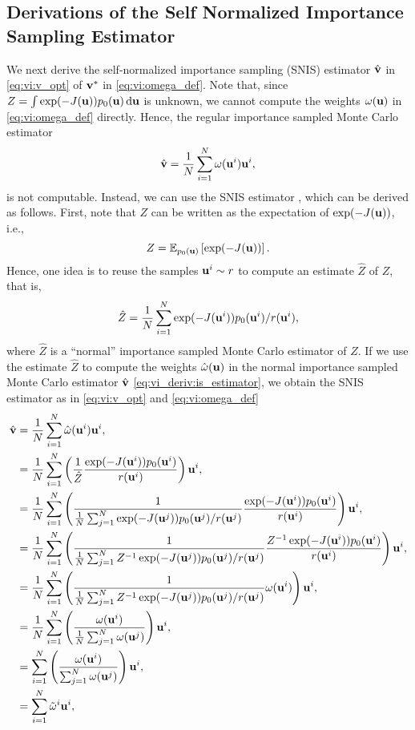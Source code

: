 \subsection{Derivations of the Self Normalized Importance Sampling Estimator} \label{app:VI SNIS}
We next derive the self-normalized importance sampling (SNIS) estimator $\hat{{\bf v}}$ in \eqref{eq:vi:v_opt} of ${\bf v}^*$ in \eqref{eq:vi:omega_def}.
Note that, since $Z=\int \exp(-J({\bf u})) p_0({\bf u}) \mathop{}\!\mathrm{d}{{\bf u}}$ is unknown, we cannot compute the weights $\omega({\bf u})$ in \eqref{eq:vi:omega_def} directly.
Hence, the regular importance sampled Monte Carlo estimator
\begin{equation} \label{eq:vi_deriv:is_estimator}
    \hat{{\bf v}} = \frac{1}{N} \sum_{i=1}^N \omega({\bf u}^i) {\bf u}^i,
\end{equation}
is not computable.
Instead, we can use the SNIS estimator \cite{owen2013monte}, which can be derived as follows.
First, note that $Z$ can be written as the expectation of $\exp(-J({\bf u}))$, i.e.,
\begin{equation}
    Z = \mathbb{E}_{p_0({\bf u})}\left[ \exp(-J({\bf u})) \right].
\end{equation}
Hence, one idea is to reuse the samples ${\bf u}^i \sim r$ to compute an estimate $\hat{Z}$ of $Z$, that is,
\begin{equation}
    \hat{Z} = \frac{1}{N} \sum_{i=1}^N \exp(-J({\bf u}^i)) p_0({\bf u}^i) / r({\bf u}^i),
\end{equation}
where $\hat{Z}$ is a ``normal'' importance sampled Monte Carlo estimator of $Z$.
If we use the estimate $\hat{Z}$ to compute the weights $\hat{\omega}({\bf u})$ in the normal importance sampled Monte Carlo estimator $\hat{{\bf v}}$ \eqref{eq:vi_deriv:is_estimator}, we obtain the SNIS estimator as in \eqref{eq:vi:v_opt} and \eqref{eq:vi:omega_def}
\begin{align}
    \hat{{\bf v}}
    &= \frac{1}{N} \sum_{i=1}^N \hat{\omega}({\bf u}^i) {\bf u}^i, \\
    &= \frac{1}{N} \sum_{i=1}^N \left( \frac{1}{ \hat{Z} } \frac{ \exp(-J({\bf u}^i))p_0({\bf u}^i) }{ r({\bf u}^i) }  \right) {\bf u}^i, \\
    &= \frac{1}{N} \sum_{i=1}^N \left( \frac{1}{ \frac{1}{N} \sum_{j=1}^N \exp(-J({\bf u}^j)) p_0({\bf u}^j) / r({\bf u}^j) } \frac{ \exp(-J({\bf u}^i))p_0({\bf u}^i) }{ r({\bf u}^i) }  \right) {\bf u}^i, \\
    &= \frac{1}{N} \sum_{i=1}^N \left( \frac{1}{ \frac{1}{N} \sum_{j=1}^N Z^{-1} \exp(-J({\bf u}^j)) p_0({\bf u}^j) / r({\bf u}^j) } \frac{ Z^{-1} \exp(-J({\bf u}^i))p_0({\bf u}^i) }{ r({\bf u}^i) }  \right) {\bf u}^i, \\
    &= \frac{1}{N} \sum_{i=1}^N \left( \frac{1}{ \frac{1}{N} \sum_{j=1}^N Z^{-1} \exp(-J({\bf u}^j)) p_0({\bf u}^j) / r({\bf u}^j) } \omega({\bf u}^i)  \right) {\bf u}^i, \\
    &= \frac{1}{N} \sum_{i=1}^N \left( \frac{\omega({\bf u}^i)}{ \frac{1}{N} \sum_{j=1}^N \omega({\bf u}^j) }  \right) {\bf u}^i, \\
    &= \sum_{i=1}^N \left( \frac{\omega({\bf u}^i)}{ \sum_{j=1}^N \omega({\bf u}^j) }  \right) {\bf u}^i, \\
    &= \sum_{i=1}^N \tilde{\omega}^i {\bf u}^i,
\end{align}
